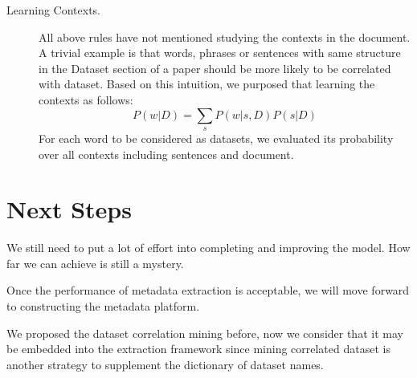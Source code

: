 \documentclass[fleqn]{article}
\begin{document}
\begin{description}
\item[Learning Contexts.] All above rules have not mentioned studying the contexts in the document. A trivial example is that words, phrases or sentences with same structure in the Dataset section of a paper should be more likely to be correlated with dataset. Based on this intuition, we purposed that learning the contexts as follows:
$$P(w | D) = \sum_{s} P(w | s, D) P(s | D)$$  
For each word to be considered as datasets, we evaluated its probability over all contexts including sentences and document.
\end{description}


\section{Next Steps}

We still need to put a lot of effort into completing and improving the model. How far we can achieve is still a mystery.

Once the performance of metadata extraction is acceptable, we will move forward to constructing the metadata platform.

We proposed the dataset correlation mining before, now we consider that it may be embedded into the extraction framework since mining correlated dataset is another strategy to supplement the dictionary of dataset names.
\end{document}
